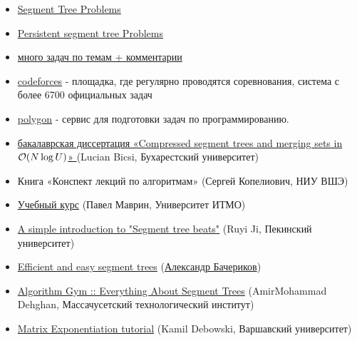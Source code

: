 


\begin{itemize}
	
	\item \href{https://codeforces.com/blog/entry/22616}{Segment Tree Problems}
	
	\item \href{https://codeforces.com/blog/entry/56880}{Persistent segment tree Problems}
	
	\item \href{https://codeforces.com/blog/entry/55274}{много задач по темам + комментарии}
	
	\item \href{https://codeforces.com}{codeforces} - площадка, где регулярно проводятся соревнования, система с более 6700 официальных задач
	
	\item \href{https://polygon.codeforces.com}{polygon} - сервис для подготовки задач по программированию.
	
	\item \href{https://codeforces.com/blog/entry/83170}{бакалаврская диссертация «Compressed segment trees and merging sets in $ \mathcal{O}(N \log U)$» } (Lucian Bicsi, Бухарестский университет)
	
	
	\item Книга «Конспект лекций по алгоритмам» (Сергей Копелиович, НИУ ВШЭ)
	
	\item \href{https://codeforces.com/edu/course/2}{Учебный курс} (Павел Маврин, Университет ИТМО)
	\item \href{https://codeforces.com/blog/entry/57319}{A simple introduction to "Segment tree beats"} (Ruyi Ji, Пекинский университет)
	
	\item \href{https://codeforces.com/blog/entry/18051}{Efficient and easy segment trees} (\href{http://finals.snarknews.info/index.cgi?data=2011/teams/knu&class=final2011&year=2011}{Александр Бачериков})
	
	\item \href{https://codeforces.com/blog/entry/15890}{Algorithm Gym :: Everything About Segment Trees} (AmirMohammad Dehghan, Массачусетский технологический институт)
	
	\item \href{https://codeforces.com/blog/entry/80195}{Matrix Exponentiation tutorial} (Kamil Debowski, Варшавский университет)
	

\end{itemize}
